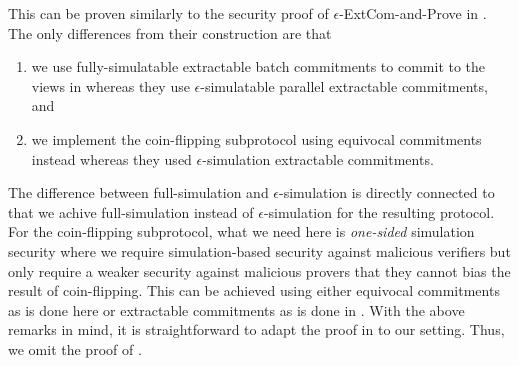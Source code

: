 This can be proven similarly to the security proof of $\epsilon$-ExtCom-and-Prove in \cite[Section 6.5]{C:CCLY22}. The only differences from their construction are that 
\begin{enumerate}
\item we use fully-simulatable extractable batch commitments to commit to the views in  whereas they use $\epsilon$-simulatable parallel extractable commitments, and
\item we implement the coin-flipping subprotocol  using equivocal commitments instead whereas they used $\epsilon$-simulation extractable commitments.   
\end{enumerate}

The difference between full-simulation and $\epsilon$-simulation is directly connected to that we achive full-simulation instead of $\epsilon$-simulation for the resulting protocol. 
For the coin-flipping subprotocol, what we need here is \emph{one-sided} simulation security where we require simulation-based security against malicious verifiers but only require a weaker security against malicious provers that they cannot bias the result of coin-flipping.   
This can be achieved using either equivocal commitments as is done here or extractable commitments as is done in \cite[Section 6.5]{C:CCLY22}. With the above remarks in mind, it is straightforward to adapt the proof in \cite[Section 6.5]{C:CCLY22} to our setting. 
Thus, we omit the proof of .
